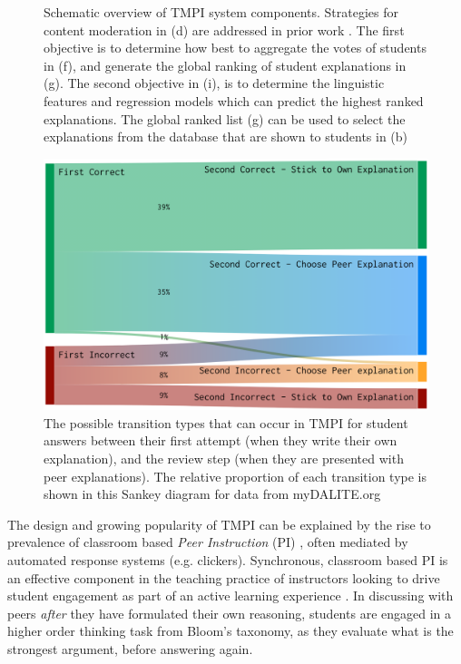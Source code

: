 \documentclass[notitlepage,12pt]{jedm}
\begin{document}
\begin{figure}[H]
	\centering
	\def\svgscale{0.70}
	
	\caption{
		Schematic overview of TMPI system components.
		Strategies for content moderation in (d) are addressed in prior work 
		\protect\cite{gagnon_filtering_2019}.
		The first objective is to determine how best to aggregate the votes of 
		students in (f), and generate the global ranking of student 
		explanations in (g). 
		The second objective in (i), is to determine the linguistic features 
		and regression models which can predict the highest ranked explanations.
		The global ranked list (g) can be used to select the explanations from 
		the database that are shown to students in (b) 
	}
	\label{fig:tmpi_research}
\end{figure}

\begin{figure}[H]
	\centering
	\includegraphics[width=0.6\linewidth]{img/transitions_final.png}
	\caption{The possible transition types that can occur in TMPI for student 
	answers between their first attempt (when they write their own 
	explanation), and the review step (when they are presented with peer 
	explanations). 
	The relative proportion of each transition type is shown in this Sankey 
	diagram for data from myDALITE.org}
	\label{fig:tmpi_sankey}
\end{figure}


The design and growing popularity of TMPI can be explained by the rise to 
prevalence of classroom based \textit{Peer Instruction} (PI) 
\cite{crouch_peer_2001}, often mediated by automated response systems (e.g. 
clickers).
Synchronous, classroom based PI is an effective component in the teaching 
practice of instructors looking to drive student engagement as part of an 
active learning experience \cite{charles_beyond_2015}. 
In discussing with peers \textit{after} they have formulated their own 
reasoning, students are engaged in a higher order thinking task from Bloom's 
taxonomy, as they evaluate what is the strongest argument, before answering 
again.
\end{document}
